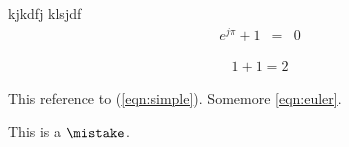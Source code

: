 \documentclass[a4paper]{article}
\begin{document}
kjkdfj
klsjdf
\begin{eqnarray}
    e^{j\pi} + 1 &=& 0
    \label{eqn:euler}
\end{eqnarray}

\begin{eqnarray}
    1 +1 = 2
    \label{eqn:simple}
\end{eqnarray}

This reference to (\ref{eqn:simple}).
Somemore \ref{eqn:euler}.

This is a $\mistake$.
\end{document}
